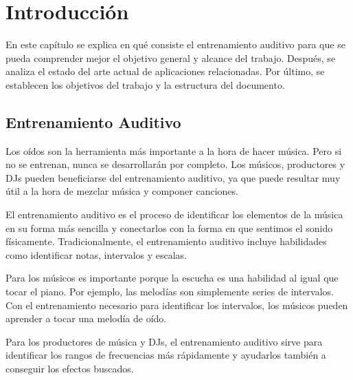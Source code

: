 \documentclass[12pt,twoside,titlepage]{report}
\begin{document}

   


\chapter{Introducción}

En este capítulo se explica en qué consiste el entrenamiento auditivo para que se pueda comprender mejor el objetivo general y alcance del trabajo. Después, se analiza el estado del arte actual de aplicaciones relacionadas. Por último, se establecen los objetivos del trabajo y la estructura del documento.

\pagestyle{fancy}

\setlength{\parskip}{0.75em}
\renewcommand{\baselinestretch}{1.25}


\setcounter{page}{1}

\section{Entrenamiento Auditivo}
\label{sec:eartraining}

Los oídos son la herramienta más importante a la hora de hacer música. Pero si no se entrenan, nunca se desarrollarán por completo. Los músicos, productores y DJs pueden beneficiarse del entrenamiento auditivo, ya que puede resultar muy útil a la hora de mezclar música y componer canciones.

El entrenamiento auditivo es el proceso de identificar los elementos de la música en su forma más sencilla y conectarlos con la forma en que sentimos el sonido físicamente. Tradicionalmente, el entrenamiento auditivo incluye habilidades como identificar notas, intervalos y escalas. 

Para los músicos es importante porque la escucha es una habilidad al igual que tocar el piano. Por ejemplo, las melodías son simplemente series de intervalos. Con el entrenamiento necesario para identificar los intervalos, los músicos pueden aprender a tocar una melodía de oído.

Para los productores de música y DJs, el entrenamiento auditivo sirve para identificar los rangos de frecuencias más rápidamente y ayudarlos también a conseguir los efectos buscados.
\cite{entrenamientoAutitivo1}
\end{document}
